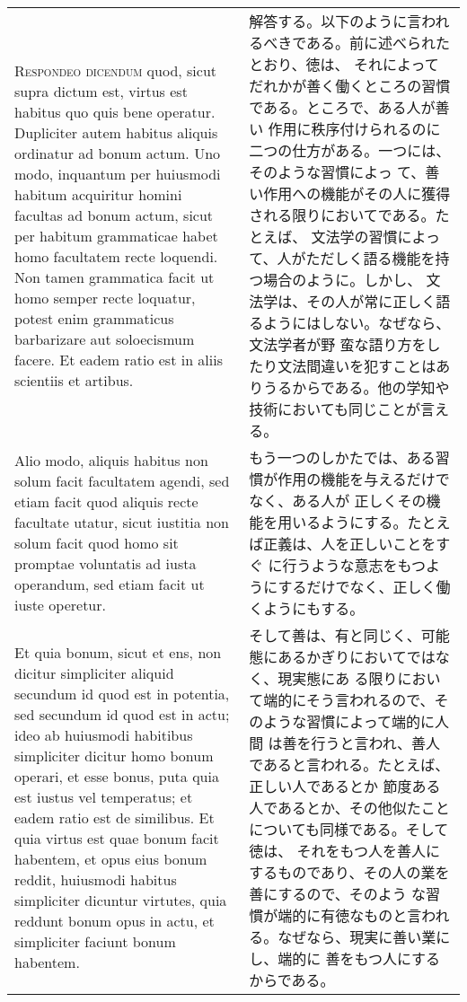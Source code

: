 \documentclass[10pt]{jsarticle}
\begin{document}
\begin{longtable}{p{21em}p{21em}}
\\

{\scshape Respondeo dicendum} quod, sicut supra dictum est, virtus est habitus
quo quis bene operatur. Dupliciter autem habitus aliquis ordinatur ad
bonum actum. Uno modo, inquantum per huiusmodi habitum acquiritur
homini facultas ad bonum actum, sicut per habitum grammaticae habet
homo facultatem recte loquendi. Non tamen grammatica facit ut homo
semper recte loquatur, potest enim grammaticus barbarizare aut
soloecismum facere. Et eadem ratio est in aliis scientiis et
artibus. 

&

解答する。以下のように言われるべきである。前に述べられたとおり、徳は、
それによってだれかが善く働くところの習慣である。ところで、ある人が善い
作用に秩序付けられるのに二つの仕方がある。一つには、そのような習慣によっ
て、善い作用への機能がその人に獲得される限りにおいてである。たとえば、
文法学の習慣によって、人がただしく語る機能を持つ場合のように。しかし、
文法学は、その人が常に正しく語るようにはしない。なぜなら、文法学者が野
蛮な語り方をしたり文法間違いを犯すことはありうるからである。他の学知や
技術においても同じことが言える。

\\

Alio modo, aliquis habitus non solum facit facultatem agendi,
sed etiam facit quod aliquis recte facultate utatur, sicut iustitia
non solum facit quod homo sit promptae voluntatis ad iusta operandum,
sed etiam facit ut iuste operetur. 

&

もう一つのしかたでは、ある習慣が作用の機能を与えるだけでなく、ある人が
正しくその機能を用いるようにする。たとえば正義は、人を正しいことをすぐ
に行うような意志をもつようにするだけでなく、正しく働くようにもする。

\\

Et quia bonum, sicut et ens, non
dicitur simpliciter aliquid secundum id quod est in potentia, sed
secundum id quod est in actu; ideo ab huiusmodi habitibus simpliciter
dicitur homo bonum operari, et esse bonus, puta quia est iustus vel
temperatus; et eadem ratio est de similibus. Et quia virtus est quae
bonum facit habentem, et opus eius bonum reddit, huiusmodi habitus
simpliciter dicuntur virtutes, quia reddunt bonum opus in actu, et
simpliciter faciunt bonum habentem. 

&

そして善は、有と同じく、可能態にあるかぎりにおいてではなく、現実態にあ
る限りにおいて端的にそう言われるので、そのような習慣によって端的に人間
は善を行うと言われ、善人であると言われる。たとえば、正しい人であるとか
節度ある人であるとか、その他似たことについても同様である。そして徳は、
それをもつ人を善人にするものであり、その人の業を善にするので、そのよう
な習慣が端的に有徳なものと言われる。なぜなら、現実に善い業にし、端的に
善をもつ人にするからである。


\end{longtable}
\end{document}
